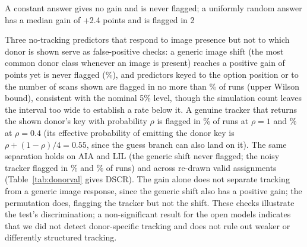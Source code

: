 \documentclass[11pt]{article}
\begin{document}

A constant answer gives no gain and is never flagged; a uniformly random answer has a median gain of +2.4 points and is flagged in 2%

Three no-tracking predictors that respond to image presence but not to which donor is shown serve as false-positive checks: a generic image shift (the most common donor class whenever an image is present) reaches a positive gain of \vfourDonorValShiftGain{} points yet is never flagged (\vfourDonorValShiftDetect{}\%), and predictors keyed to the option position or to the number of scans shown are flagged in no more than \vfourDonorValPositionDetectHi{}\% of runs (upper Wilson bound), consistent with the nominal 5\% level, though the simulation count leaves the interval too wide to establish a rate below it. A genuine tracker that returns the shown donor's key with probability $\rho$ is flagged in \vfourDonorValTrackFullDetect{}\% of runs at $\rho=1$ and \vfourDonorValTrackLowDetect{}\% at $\rho=0.4$ (its effective probability of emitting the donor key is $\rho+(1-\rho)/4=0.55$, since the guess branch can also land on it). The same separation holds on AIA and LIL (the generic shift never flagged; the noisy tracker flagged in \vfourDonorValTrackLowDetectAIA{}\% and \vfourDonorValTrackLowDetectLIL{}\% of runs) and across re-drawn valid assignments (Table~\ref{tab:donorval} gives DSCR). The gain alone does not separate tracking from a generic image response, since the generic shift also has a positive gain; the permutation does, flagging the tracker but not the shift. These checks illustrate the test's discrimination; a non-significant result for the open models indicates that we did not detect donor-specific tracking and does not rule out weaker or differently structured tracking.

\begin{table}[t]
\centering
\footnotesize
\setlength{\tabcolsep}{4pt}
\resizebox{\columnwidth}{!}{%
%
}
\caption{Diagnostics on the DSCR donor swap (\vfourDonorValN{} recipients), run on synthetic predictors with known behaviour over \vfourDonorValSims{} simulations: the donor-tracking gain, the image-vs-text answer-change rate, and the share of simulations in which the permutation flags tracking ($p<.05$). A generic image shift that ignores which donor is shown reaches a positive gain and a high answer-change rate yet is never flagged, and at $\rho=0.4$ a genuine tracker and the generic shift share the same gain (\vfourDonorValTrackLowGain{} vs \vfourDonorValShiftGain{}~pp): neither the gain nor the answer-change rate separates them, the permutation does.}
\label{tab:donorval}
\end{table}
\end{document}

